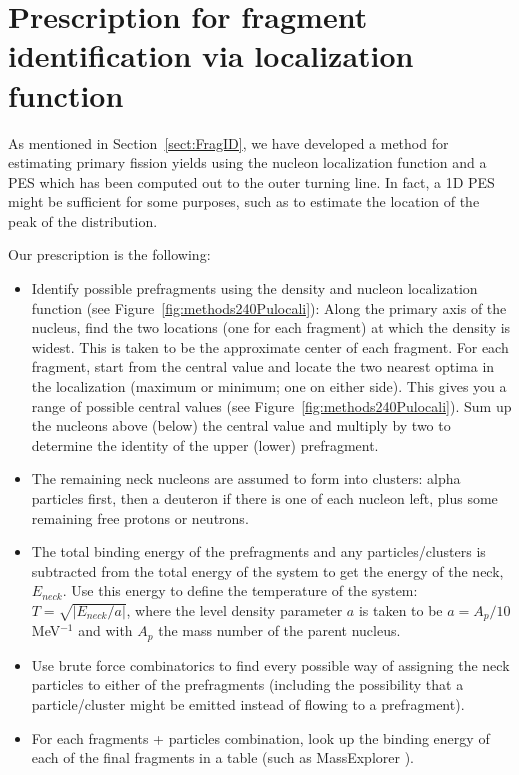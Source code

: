 \chapter{Prescription for fragment identification via localization function}\label{append:Fragments}
As mentioned in Section~\ref{sect:FragID}, we have developed a method for estimating primary fission yields using the nucleon localization function and a PES which has been computed out to the outer turning line. In fact, a 1D PES might be sufficient for some purposes, such as to estimate the location of the peak of the distribution.

Our prescription is the following:

\begin{itemize}
	\item Identify possible prefragments using the density and nucleon localization function (see Figure~\ref{fig:methods240Pulocali}):
	\subitem Along the primary axis of the nucleus, find the two locations (one for each fragment) at which the density is widest. This is taken to be the approximate center of each fragment.
	\subitem For each fragment, start from the central value and locate the two nearest optima in the localization (maximum or minimum; one on either side). This gives you a range of possible central values (see Figure~\ref{fig:methods240Pulocali}).
	\subitem Sum up the nucleons above (below) the central value and multiply by two to determine the identity of the upper (lower) prefragment.
	\item The remaining neck nucleons are assumed to form into clusters: alpha particles first, then a deuteron if there is one of each nucleon left, plus some remaining free protons or neutrons.
	\item The total binding energy of the prefragments and any particles/clusters is subtracted from the total energy of the system to get the energy of the neck, $E_{neck}$.
	\subitem Use this energy to define the temperature of the system: $T = \sqrt{\left|E_{neck}/a\right|}$, where the level density parameter $a$ is taken to be $a=A_p/10$ MeV$^{-1}$ and with $A_p$ the mass number of the parent nucleus.
	\item Use brute force combinatorics to find every possible way of assigning the neck particles to either of the prefragments (including the possibility that a particle/cluster might be emitted instead of flowing to a prefragment).
	\item For each fragments + particles combination, look up the binding energy of each of the final fragments in a table (such as  MassExplorer \cite{massexplorer}).

\end{itemize}
